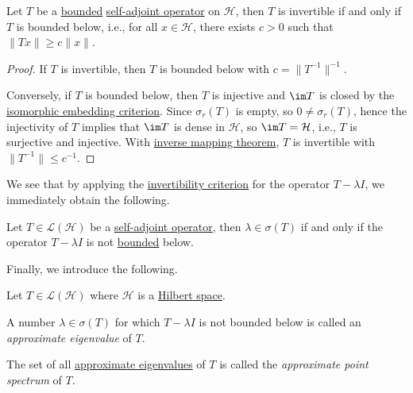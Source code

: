 \begin{lemma}\label{lma:invertibility-criterion}
	Let \(T\) be a \hyperref[rmk:bounded-op]{bounded} \hyperref[def:self-adjoint-op]{self-adjoint operator} on \(\mathcal{H} \), then \(T\) is invertible if and only if \(T\) is bounded below, i.e., for all \(x\in \mathcal{H} \), there exists \(c>0\) such that \(\lVert Tx \rVert \geq c\lVert x \rVert \).
\end{lemma}
\begin{proof}
	If \(T\) is invertible, then \(T\) is bounded below with \(c = \lVert T^{-1}  \rVert ^{-1} \).

	Conversely, if \(T\) is bounded below, then \(T\) is injective and \(\im T\) is closed by the \hyperref[prop:isomorphic-embedding]{isomorphic embedding criterion}. Since \(\sigma _r(T)\) is empty, so \(0 \neq \sigma _r(T)\), hence the injectivity of \(T\) implies that \(\im T\) is dense in \(\mathcal{H} \), so \(\im T=\mathcal{H} \), i.e., \(T\) is surjective and injective. With \hyperref[thm:inverse-mapping]{inverse mapping theorem}, \(T\) is invertible with \(\lVert T^{-1}  \rVert \leq c^{-1} \).
\end{proof}

We see that by applying the \hyperref[lma:invertibility-criterion]{invertibility criterion} for the operator \(T - \lambda I\), we immediately obtain the following.

\begin{corollary}\label{col:criterion-of-spectrum-points}
	Let \(T\in \mathcal{L} (\mathcal{H} )\) be a \hyperref[def:self-adjoint-op]{self-adjoint operator}, then \(\lambda \in \sigma (T)\) if and only if the operator \(T - \lambda I\) is not \hyperref[rmk:bounded-op]{bounded} below.
\end{corollary}

Finally, we introduce the following.

\begin{definition*}
	Let \(T\in \mathcal{L} (\mathcal{H} )\) where \(\mathcal{H} \) is a \hyperref[def:Hilbert-space]{Hilbert space}.
	\begin{definition}\label{def:approximate-eigenvalue}
		A number \(\lambda \in \sigma (T)\) for which \(T - \lambda I\) is not bounded below is called an \emph{approximate eigenvalue} of \(T\).
	\end{definition}
	\begin{definition}\label{def:approximate-point-spectrum}
		The set of all \hyperref[def:approximate-eigenvalue]{approximate eigenvalues} of \(T\) is called the \emph{approximate point spectrum} of \(T\).
	\end{definition}
\end{definition*}

